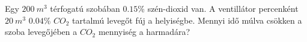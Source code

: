 Egy $200\ m^3$ térfogatú szobában $0.15$\% szén-dioxid van. A ventillátor
percenként $20\ m^3$ $0.04$\% $CO_2$ tartalmú levegőt fúj a helyiségbe.
Mennyi idő múlva csökken a szoba levegőjében a $CO_2$ mennyiség a
harmadára?


